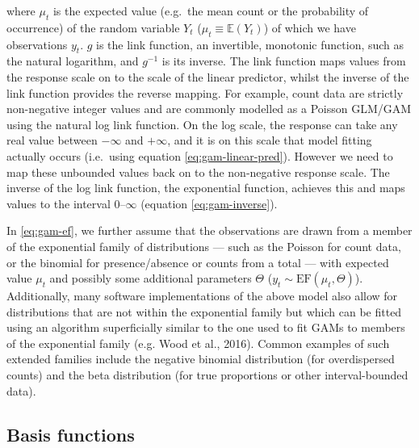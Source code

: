 \documentclass[12pt,]{article}
\begin{document}
where \(\mu_t\) is the expected value (e.g.~the mean count or the
probability of occurrence) of the random variable \(Y_t\)
(\(\mu_t \equiv \mathbb{E}(Y_t)\)) of which we have observations
\(y_t\). \(g\) is the link function, an invertible, monotonic function,
such as the natural logarithm, and \(g^{-1}\) is its inverse. The link
function maps values from the response scale on to the scale of the
linear predictor, whilst the inverse of the link function provides the
reverse mapping. For example, count data are strictly non-negative
integer values and are commonly modelled as a Poisson GLM/GAM using the
natural log link function. On the log scale, the response can take any
real value between \(-\infty\) and \(+\infty\), and it is on this scale
that model fitting actually occurs (i.e.~using equation
\eqref{eq:gam-linear-pred}). However we need to map these unbounded
values back on to the non-negative response scale. The inverse of the
log link function, the exponential function, achieves this and maps
values to the interval 0--\(\infty\) (equation \eqref{eq:gam-inverse}).

In \eqref{eq:gam-ef}, we further assume that the observations are drawn
from a member of the exponential family of distributions --- such as the
Poisson for count data, or the binomial for presence/absence or counts
from a total --- with expected value \(\mu_t\) and possibly some
additional parameters \(\Theta\)
(\(y_t \sim \text{EF}(\mu_t, \Theta)\)). Additionally, many software
implementations of the above model also allow for distributions that are
not within the exponential family but which can be fitted using an
algorithm superficially similar to the one used to fit GAMs to members
of the exponential family (e.g. Wood et al., 2016). Common examples of
such extended families include the negative binomial distribution (for
overdispersed counts) and the beta distribution (for true proportions or
other interval-bounded data).

\subsection{Basis functions}\label{basis-functions}
\end{document}
